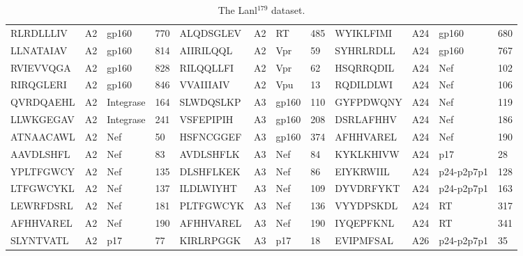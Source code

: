 \begin{table}[htp]
\begin{center}
\begin{sideways}
{\begin{tabulary}{1.5\textwidth}{|l|l|l|l|l|l|l|l|l|l|l|l|}
RLRDLLLIV & A2 & gp160 & 770 & ALQDSGLEV & A2 & RT & 485 & WYIKLFIMI & A24 & gp160 & 680 \\
LLNATAIAV & A2 & gp160 & 814 & AIIRILQQL & A2 & Vpr & 59 & SYHRLRDLL & A24 & gp160 & 767 \\
RVIEVVQGA & A2 & gp160 & 828 & RILQQLLFI & A2 & Vpr & 62 & HSQRRQDIL & A24 & Nef & 102 \\
RIRQGLERI & A2 & gp160 & 846 & VVAIIIAIV & A2 & Vpu & 13 & RQDILDLWI & A24 & Nef & 106 \\
QVRDQAEHL & A2 & Integrase & 164 & SLWDQSLKP & A3 & gp160 & 110 & GYFPDWQNY & A24 & Nef & 119 \\
LLWKGEGAV & A2 & Integrase & 241 & VSFEPIPIH & A3 & gp160 & 208 & DSRLAFHHV & A24 & Nef & 186 \\
ATNAACAWL & A2 & Nef & 50 & HSFNCGGEF & A3 & gp160 & 374 & AFHHVAREL & A24 & Nef & 190 \\
AAVDLSHFL & A2 & Nef & 83 & AVDLSHFLK & A3 & Nef & 84 & KYKLKHIVW & A24 & p17 & 28 \\
YPLTFGWCY & A2 & Nef & 135 & DLSHFLKEK & A3 & Nef & 86 & EIYKRWIIL & A24 & p24-p2p7p1 & 128 \\
LTFGWCYKL & A2 & Nef & 137 & ILDLWIYHT & A3 & Nef & 109 & DYVDRFYKT & A24 & p24-p2p7p1 & 163 \\
LEWRFDSRL & A2 & Nef & 181 & PLTFGWCYK & A3 & Nef & 136 & VYYDPSKDL & A24 & RT & 317 \\
AFHHVAREL & A2 & Nef & 190 & AFHHVAREL & A3 & Nef & 190 & IYQEPFKNL & A24 & RT & 341 \\
SLYNTVATL & A2 & p17 & 77 & KIRLRPGGK & A3 & p17 & 18 & EVIPMFSAL & A26 & p24-p2p7p1 & 35 \bigstrut[b] \\	
\hline
\end{tabulary}
}
\end{sideways}
\end{center}
\caption[The Lanl$^{179}$ dataset]{The Lanl$^{179}$ dataset.}\label{appendixa/table2}
\end{table}

